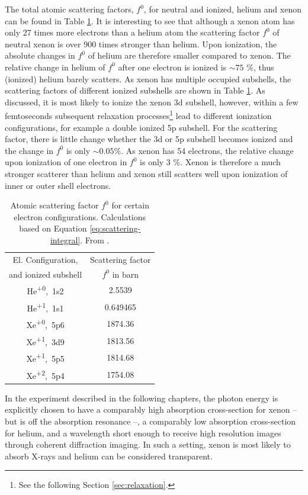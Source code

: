 The total atomic scattering factors, $f^{0}$, for neutral and ionized, helium and xenon can be found in Table \ref{tab:helium-xenon-el-scattering-crossection}. It is interesting to see that although a xenon atom has only 27 times more electrons than a helium atom the scattering factor $f^{0}$ of neutral xenon is over 900 times stronger than helium. Upon ionization, the absolute changes in $f^{0}$ of helium are therefore smaller compared to xenon. The relative change in helium of $f^{0}$ after one electron is ionized is $\sim 75$ \%, thus (ionized) helium barely scatters. As xenon has multiple occupied subshells, the scattering factors of different ionized subshells are shown in Table \ref{tab:helium-xenon-el-scattering-crossection}. As discussed, it is most likely to ionize the xenon 3d subshell, however, within a few femtoseconds subsequent relaxation processes\footnote{See the following Section \ref{sec:relaxation}.} lead to different ionization configurations, for example a double ionized 5p subshell. For the scattering factor, there is little change whether the 3d or 5p subshell becomes ionized and the change in $f^{0}$ is only $\sim 0.05$\%. As xenon has 54 electrons, the relative change upon ionization of one electron in $f^{0}$ is only 3 \%. Xenon is therefore a much stronger scatterer than helium and xenon still scatters well upon ionization of inner or outer shell electrons.  
\begin{table}
	\centering
		\begin{tabular}{ | c | c | }
		\hline
			El. Configuration, & Scattering factor \\
			and ionized subshell & $f^{0}$ in barn \\ \hline
			He\textsuperscript{+0},\ 1s2 & 2.5539  \\ \hline
			He\textsuperscript{+1},\ 1s1 & 0.649465  \\ \hline
			Xe\textsuperscript{+0},\ 5p6 & 1874.36  \\ \hline
			Xe\textsuperscript{+1},\ 3d9 & 1813.56  \\ \hline
			Xe\textsuperscript{+1},\ 5p5 & 1814.68  \\ \hline
			Xe\textsuperscript{+2},\ 5p4 & 1754.08  \\ \hline
		\end{tabular}
	\caption[Atomic scattering factors for helium and xenon.]{Atomic scattering factor $f^{0}$ for certain electron configurations. Calculations based on Equation \eqref{eq:scattering-integral}. From \cite{Ho-2016-PC}.}
	\label{tab:helium-xenon-el-scattering-crossection}
\end{table}
In the experiment described in the following chapters, the photon energy is explicitly chosen to have a comparably high absorption cross-section for xenon -- but is off the absorption resonance --, a comparably low absorption cross-section for helium, and a wavelength short enough to receive high resolution images through coherent diffraction imaging. In such a setting, xenon is most likely to absorb X-rays and helium can be considered transparent.
%
%
%
%
%
